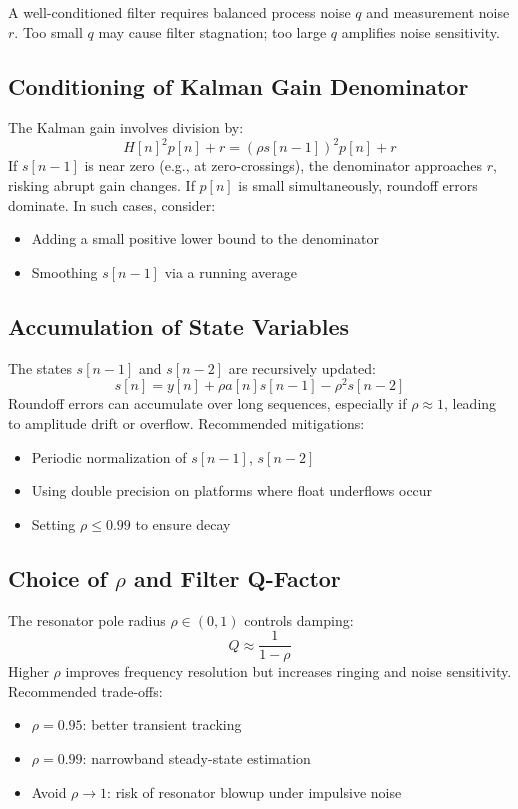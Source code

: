 \documentclass{article}
\begin{document}
A well-conditioned filter requires balanced process noise \( q \) and measurement noise \( r \). Too small \( q \) may cause filter stagnation; too large \( q \) amplifies noise sensitivity.

\subsection{Conditioning of Kalman Gain Denominator}

The Kalman gain involves division by:
\[
H[n]^2 p[n] + r = (\rho s[n-1])^2 p[n] + r
\]
If \( s[n-1] \) is near zero (e.g., at zero-crossings), the denominator approaches \( r \), risking abrupt gain changes. If \( p[n] \) is small simultaneously, roundoff errors dominate. In such cases, consider:
\begin{itemize}
  \item Adding a small positive lower bound to the denominator
  \item Smoothing \( s[n-1] \) via a running average
\end{itemize}

\subsection{Accumulation of State Variables}

The states \( s[n-1] \) and \( s[n-2] \) are recursively updated:
\[
s[n] = y[n] + \rho a[n] s[n-1] - \rho^2 s[n-2]
\]
Roundoff errors can accumulate over long sequences, especially if \( \rho \approx 1 \), leading to amplitude drift or overflow. Recommended mitigations:
\begin{itemize}
\item Periodic normalization of \( s[n-1] \), \( s[n-2] \)
\item Using double precision on platforms where float underflows occur
\item Setting \(\rho \leq 0.99\) to ensure decay
\end{itemize}

\subsection{Choice of \texorpdfstring{$\rho$}{rho} and Filter Q-Factor}

The resonator pole radius \( \rho \in (0, 1) \) controls damping:
\[
Q \approx \frac{1}{1 - \rho}
\]
Higher \( \rho \) improves frequency resolution but increases ringing and noise sensitivity. Recommended trade-offs:
\begin{itemize}
\item \(\rho = 0.95\): better transient tracking
\item \(\rho = 0.99\): narrowband steady-state estimation
\item Avoid \(\rho \to 1\): risk of resonator blowup under impulsive noise
\end{itemize}
\end{document}

